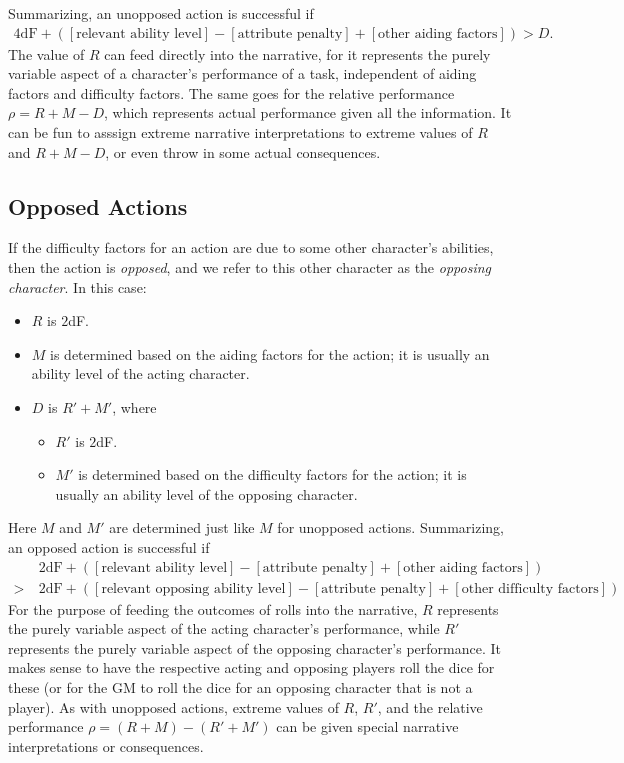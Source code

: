 \documentclass[12pt]{article}
\newcommand{\emdex}[1]{\emph{#1}\index{#1}}
\begin{document}
Summarizing, an unopposed action is successful if
\begin{align*}
4\text{dF}
+([\text{relevant ability level}]
-[\text{attribute penalty}]
+[\text{other aiding factors}])
> D.
\end{align*}
The value of $R$ can feed directly into the narrative,
for it represents the purely variable aspect of a character's performance of a task,
independent of aiding factors and difficulty factors.
The same goes for the relative performance $\rho=R+M-D$, which represents actual performance given all the information.
It can be fun to asssign extreme narrative interpretations to extreme values of $R$ and $R+M-D$,
or even throw in some actual consequences.


\subsection{Opposed Actions}\label{sec:opposed}
If the difficulty factors for an action are due to some other character's abilities,
then the action is \emph{opposed}, and we refer to this other character 
as the \emdex{opposing character}.
In this case:
\vspace{-1em}
\begin{itemize}
\item $R$ is $2$dF.
\item $M$ is determined based on the aiding factors for the action; it is usually an ability level of the acting character.
\item $D$ is $R' + M'$, where
\begin{itemize}
\item $R'$ is $2$dF.
\item $M'$ is determined based on the difficulty factors for the action; it is usually an ability level of the opposing character.
\end{itemize}
\end{itemize}
Here $M$ and $M'$ are determined just like $M$ for unopposed actions.
Summarizing, an opposed action is successful if
\begin{align*}
&2\text{dF}
+([\text{relevant ability level}]
-[\text{attribute penalty}]
+[\text{other aiding factors}])\\
>\ & 
2\text{dF}
+([\text{relevant opposing ability level}]
-[\text{attribute penalty}]
+[\text{other difficulty factors}]).
\end{align*}
For the purpose of feeding the outcomes of rolls into the narrative,
$R$ represents the purely variable aspect of the acting character's performance,
while $R'$ represents the purely variable aspect of the opposing character's performance.
It makes sense to have the respective acting and opposing players roll the dice for these (or for the GM to roll the dice for an opposing character that is not a player).
As with unopposed actions, extreme values of $R$, $R'$,
and the relative performance $\rho=(R+M)-(R'+M')$
can be given special narrative interpretations or consequences.
\end{document}
